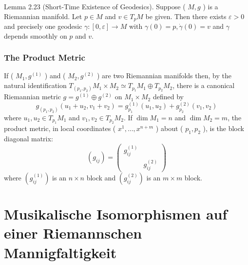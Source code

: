 \documentclass[10pt, letterpaper]{article}
\begin{document}
Lemma 2.23 (Short-Time Existence of Geodesics). Suppose ( $M, g$ ) is a Riemannian manifold. Let $p \in M$ and $v \in T_{p} M$ be given. Then there exists $\varepsilon>0$ and precisely one geodesic $\gamma:[0, \varepsilon] \rightarrow M$ with $\gamma(0)=p, \dot{\gamma}(0)=v$ and $\gamma$ depends smoothly on $p$ and $v$.



\subsubsection*{The Product Metric}
If ( $M_{1}, g^{(1)}$ ) and ( $M_{2}, g^{(2)}$ ) are two Riemannian manifolds then, by the natural identification $T_{\left(p_{1}, p_{2}\right)} M_{1} \times M_{2} \simeq T_{p_{1}} M_{1} \oplus T_{p_{2}} M_{2}$, there is a canonical Riemannian metric $g=g^{(1)} \oplus g^{(2)}$ on $M_{1} \times M_{2}$ defined by
$$
g_{\left(p_{1}, p_{2}\right)}\left(u_{1}+u_{2}, v_{1}+v_{2}\right)=g_{p_{1}}^{(1)}\left(u_{1}, u_{2}\right)+g_{p_{2}}^{(2)}\left(v_{1}, v_{2}\right)
$$
where $u_{1}, u_{2} \in T_{p_{1}} M_{1}$ and $v_{1}, v_{2} \in T_{p_{2}} M_{2}$. If $\operatorname{dim} M_{1}=n$ and $\operatorname{dim} M_{2}=m$, the product metric, in local coordinates ( $x^{1}, \ldots, x^{n+m}$ ) about ( $p_{1}, p_{2}$ ), is the block diagonal matrix:
$$
\left(g_{i j}\right)=\left(\begin{array}{cc}
g_{i j}^{(1)} & \\
& g_{i j}^{(2)}
\end{array}\right)
$$
where $\left(g_{i j}^{(1)}\right)$ is an $n \times n$ block and $\left(g_{i j}^{(2)}\right)$ is an $m \times m$ block.




\section*{Musikalische Isomorphismen auf einer Riemannschen Mannigfaltigkeit}
\end{document}

